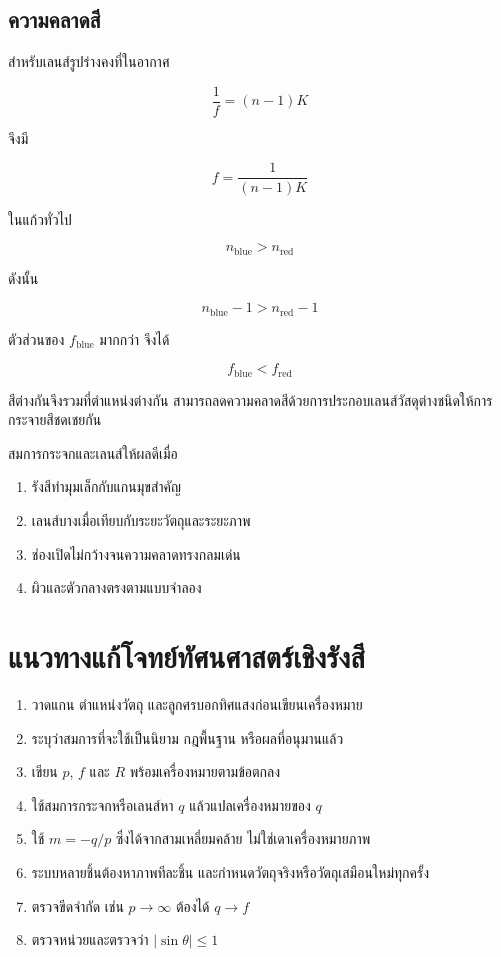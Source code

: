 \subsection{ความคลาดสี}

สำหรับเลนส์รูปร่างคงที่ในอากาศ

\[
\frac{1}{f}=(n-1)K
\]

จึงมี

\[
f=\frac{1}{(n-1)K}
\]

ในแก้วทั่วไป

\[
n_{\text{blue}}>n_{\text{red}}
\]

ดังนั้น

\[
n_{\text{blue}}-1>n_{\text{red}}-1
\]

ตัวส่วนของ $f_{\text{blue}}$ มากกว่า จึงได้

\[
\boxed{f_{\text{blue}}<f_{\text{red}}}
\]

สีต่างกันจึงรวมที่ตำแหน่งต่างกัน สามารถลดความคลาดสีด้วยการประกอบเลนส์วัสดุต่างชนิดให้การกระจายสีชดเชยกัน

\begin{tcolorbox}[title={ข้อจำกัดของสมการในบทนี้}]
สมการกระจกและเลนส์ให้ผลดีเมื่อ

\begin{enumerate}
    \item รังสีทำมุมเล็กกับแกนมุขสำคัญ
    \item เลนส์บางเมื่อเทียบกับระยะวัตถุและระยะภาพ
    \item ช่องเปิดไม่กว้างจนความคลาดทรงกลมเด่น
    \item ผิวและตัวกลางตรงตามแบบจำลอง
\end{enumerate}
\end{tcolorbox}

\section{แนวทางแก้โจทย์ทัศนศาสตร์เชิงรังสี}

\begin{enumerate}
    \item วาดแกน ตำแหน่งวัตถุ และลูกศรบอกทิศแสงก่อนเขียนเครื่องหมาย
    \item ระบุว่าสมการที่จะใช้เป็นนิยาม กฎพื้นฐาน หรือผลที่อนุมานแล้ว
    \item เขียน $p$, $f$ และ $R$ พร้อมเครื่องหมายตามข้อตกลง
    \item ใช้สมการกระจกหรือเลนส์หา $q$ แล้วแปลเครื่องหมายของ $q$
    \item ใช้ $m=-q/p$ ซึ่งได้จากสามเหลี่ยมคล้าย ไม่ใช่เดาเครื่องหมายภาพ
    \item ระบบหลายชิ้นต้องหาภาพทีละชิ้น และกำหนดวัตถุจริงหรือวัตถุเสมือนใหม่ทุกครั้ง
    \item ตรวจขีดจำกัด เช่น $p\to\infty$ ต้องได้ $q\to f$
    \item ตรวจหน่วยและตรวจว่า $|\sin\theta|\le1$
\end{enumerate}

